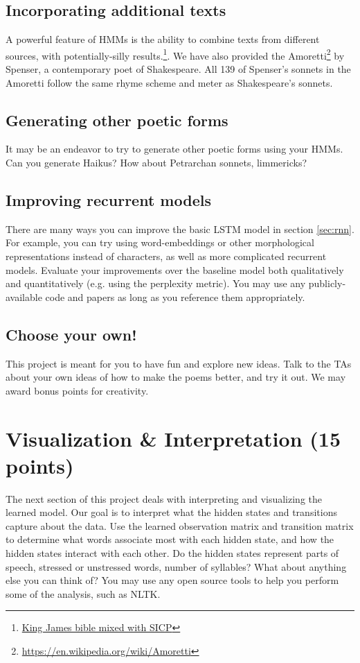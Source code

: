 \subsection{Incorporating additional texts}
A powerful feature of HMMs is the ability to combine texts from different sources, with potentially-silly results.\footnote{\href{http://kingjamesprogramming.tumblr.com/}{King James bible mixed with SICP}}. We have also provided the Amoretti\footnote{\url{https://en.wikipedia.org/wiki/Amoretti}} by Spenser, a contemporary poet of Shakespeare. All 139 of Spenser's sonnets in the Amoretti follow the same rhyme scheme and meter as Shakespeare's sonnets.

\subsection{Generating other poetic forms}
It may be an endeavor to try to generate other poetic forms using your HMMs. Can you generate Haikus? How about Petrarchan sonnets, limmericks?

\subsection{Improving recurrent models}

There are many ways you can improve the basic LSTM model in section \ref{sec:rnn}. For example, you can try using word-embeddings or other morphological representations instead of characters, as well as more complicated recurrent models. Evaluate your improvements over the baseline model both qualitatively and quantitatively (e.g. using the perplexity metric). You may use any publicly-available code and papers as long as you reference them appropriately.

\subsection{Choose your own!}
This project is meant for you to have fun and explore new ideas. Talk to the TAs about your own ideas of how to make the poems better, and try it out. We may award bonus points for creativity.

\section{Visualization \& Interpretation (15 points)}
The next section of this project deals with interpreting and visualizing the learned model. Our goal is to interpret what the hidden states and transitions capture about the data. Use the learned observation matrix and transition matrix to determine what words associate most with each hidden state, and how the hidden states interact with each other. Do the hidden states represent parts of speech, stressed or unstressed words, number of syllables? What about anything else you can think of? You may use any open source tools to help you perform some of the analysis, such as NLTK.

